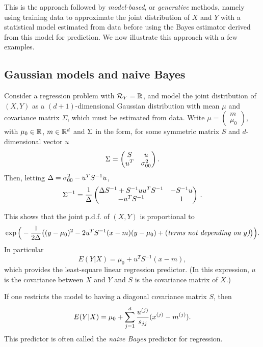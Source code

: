 This is the approach followed by {\em model-based}, or {\em generative} methods, namely using training data to approximate the joint distribution of $X$ and $Y$ with a statistical model estimated from data before using the Bayes estimator derived from this model for prediction. We now illustrate this approach with a few examples.

\subsection{Gaussian models and naive Bayes}
Consider a regression problem with ${\mathcal R}_Y = {\mathbb{R}}$, and model the joint distribution of $(X, Y)$ as a $(d+1)$-dimensional Gaussian distribution with mean $\mu$ and covariance matrix $\Sigma$, which must be estimated from data.
Write $\mu =\begin{pmatrix} m \\\mu_{0}\end{pmatrix}$, with $\mu_0\in{\mathbb{R}}$, $m\in {\mathbb{R}}^{d}$ and $\Sigma$ in the form, for some symmetric matrix $S$ and $d$-dimensional vector $u$
\[
\Sigma = \begin{pmatrix} S  & u\\  u^{T} & \sigma^{2}_{00} \end{pmatrix}.
\]
Then,  letting $\Delta = \sigma^{2}_{00} - u^{T }S^{-1}u$,
\[
\Sigma^{{-1}} = \frac1 \Delta \begin{pmatrix}\Delta S^{-1} +  S^{-1}uu^{T}S^{-1} & -S^{-1}u \\  - u^{T}S^{-1} & 1 \end{pmatrix}\,.
\]

This shows that the joint p.d.f. of $(X,Y)$ is proportional to
\begin{multline*}
\exp\Big(-\frac1{2\Delta} \big((y-\mu_{0})^{2} - 2 u^{T}S^{-1} (x-m)(y-\mu_{0})
+ \text{(\it terms not depending on $y$)} \big)\Big).
\end{multline*}
In particular
\[
E(Y|X) = \mu_{0} + u^{T} S^{-1}(x-m),
\]
which provides the least-square linear regression predictor. (In this expression, $u$ is the covariance between $X$ and $Y$ and $S$ is the covariance matrix of $X$.)
\bigskip

If one restricts the model to having  a diagonal covariance matrix $S$, then
\[
E(Y|X) = \mu_{0} + \sum_{j=1}^{d} \frac{u^{(j)} }{s_{jj}} (x^{(j)}  -m^{(j)} ).
\]
This predictor is often called the {\em naive Bayes} predictor for regression.

